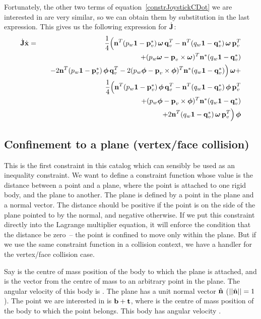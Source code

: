 Fortunately, the other two terms of equation~\ref{constrJoystickCDot} we are interested in are
very similar, so we can obtain them by substitution in the last expression. This gives us the
following expression for $\dot{\m{J}}$:
\begin{eqnarray}
\dot{\m{J}}\dot{\ve{x}} &=&
    \frac{1}{4}\Big( \ve{n}^T (p_w\m{1} - \dual{\ve{p}_v})\, \ve{\omega}\,\ve{q}_v^T
    -\ve{n}^T (q_w\m{1} - \dual{\ve{q}_v})\, \ve{\omega}\,\ve{p}_v^T \nonumber\\*&&\quad
    +(p_w\ve{\omega} - \ve{p}_v\times\ve{\omega})^T \dual{\ve{n}} (q_w\m{1} - \dual{\ve{q}_v})
    \nonumber\\*&&\quad
    -2\ve{n}^T (p_w\m{1} - \dual{\ve{p}_v})\, \ve{\phi}\,\ve{q}_v^T
    -2(p_w\ve{\phi} - \ve{p}_v\times\ve{\phi})^T \dual{\ve{n}} (q_w\m{1} - \dual{\ve{q}_v})
    \Big)\, \ve{\omega} + \nonumber\\*&&
    \frac{1}{4}\Big( \ve{n}^T (p_w\m{1} - \dual{\ve{p}_v})\, \ve{\phi}\,\ve{q}_v^T
    -\ve{n}^T (q_w\m{1} - \dual{\ve{q}_v})\, \ve{\phi}\,\ve{p}_v^T \nonumber\\*&&\quad
    +(p_w\ve{\phi} - \ve{p}_v\times\ve{\phi})^T \dual{\ve{n}} (q_w\m{1} - \dual{\ve{q}_v})
    \nonumber\\*&&\quad
    +2\ve{n}^T (q_w\m{1} - \dual{\ve{q}_v})\, \ve{\omega}\,\ve{p}_v^T \Big)\,\ve{\phi}
\end{eqnarray}


\subsection{Confinement to a plane (vertex/face collision) \label{vertexFaceConstraint}}

This is the first constraint in this catalog which can sensibly be used as an inequality
constraint. We want to define a constraint function whose value is the distance between a point
and a plane, where the point is attached to one rigid body, and the plane to another. The plane
is defined by a point in the plane and a normal vector. The distance should be positive if the
point is on the side of the plane pointed to by the normal, and negative otherwise.
If we put this constraint directly into the Lagrange multiplier equation, it will enforce the
condition that the distance be zero~-- the point is confined to move only within the plane.
But if we use the same constraint function in a collision context, we have a handler for the
vertex/face collision case.

Say  is the centre of mass position of the body to which the plane is attached, and 
is the vector from the centre of mass to an arbitrary point in the plane. The angular velocity
of this body is \ve{\omega}. The plane has a unit normal vector $\hat{\ve{n}}$
($\norm{\hat{\ve{n}}} = 1$). The point we are interested in is $\ve{b} + \ve{t}$, where  is
the centre of mass position of the body to which the point belongs. This body has angular
velocity \ve{\phi}.

